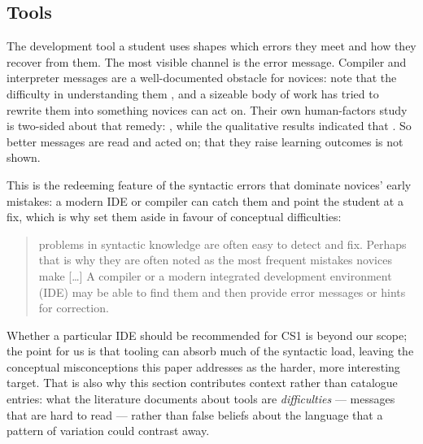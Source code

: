 \mode*
\subsection{Tools}

The development tool a student uses shapes which errors they meet and how they
recover from them. The most visible channel is the error message. Compiler and
interpreter messages are a well-documented obstacle for novices:
\textcite{Prather2017CEM} note that the difficulty in understanding them
, and a sizeable body of work has tried to rewrite them into something
novices can act on. Their own human-factors study is two-sided about that
remedy: , while the
qualitative results indicated that
. So
better messages are read and acted on; that they raise learning outcomes is
not shown.

This is the redeeming feature of the syntactic errors that dominate novices'
early mistakes: a modern IDE or compiler can catch them and point the student at
a fix, which is why \textcite{MisconceptionsSurvey2017} set them aside in favour
of conceptual difficulties:
\blockcquote{MisconceptionsSurvey2017}{problems in syntactic knowledge are often
easy to detect and fix. Perhaps that is why they are often noted as the most
frequent mistakes novices make [\ldots] A compiler or a modern integrated
development environment (IDE) may be able to find them and then provide error
messages or hints for correction.}

Whether a particular IDE should be recommended for CS1 is beyond our scope; the
point for us is that tooling can absorb much of the syntactic load, leaving the
conceptual misconceptions this paper addresses as the harder, more interesting
target.
That is also why this section contributes context rather than catalogue
entries: what the literature documents about tools are \emph{difficulties} ---
messages that are hard to read --- rather than false beliefs about the
language that a pattern of variation could contrast away.
